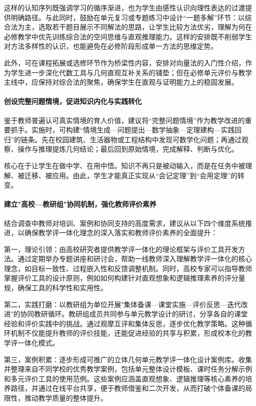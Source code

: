 \documentclass[UTF8,a4paper,12pt,twoside]{ctexart}
\begin{document}
这样的认知序列既强调学习的循序渐进，也为学生由感性认识向理性表达的过渡提供明确路径。与此同时，鼓励在单元复习或专题练习中设计“一题多解”环节：以综合法为主，选取若干题目展示不同解法的思路，让学生比较方法优劣，理解为何在必修教学中优先训练综合法的空间思维与直观推理能力。这样的安排既不削弱学生对方法多样性的认识，也能避免在必修阶段形成单一方法的思维定势。

此外，可在课程拓展或选修环节作为桥梁性内容，安排对向量法的入门性介绍，作为学生进一步深化代数工具与几何直观互补关系的铺垫；但在必修单元评价与教学主线中，应保持对综合法的聚焦，确保学生在直观与证明能力上的稳固发展。

\paragraph{创设完整问题情境，促进知识内化与实践转化}

鉴于教师普遍认可真实情境的育人价值，建议将“完整问题情境”作为教学改进的重要抓手。实施时，可构建“情境生成—问题提出—数学抽象—定理建构—实践回归”的链条。先在校园建筑、生活器物或工程结构中发现可数学化问题；再通过观察、操作与推理提炼几何结论；最后回到原始情境，完成解释、判断与优化。

核心在于让学生在做中学、在用中悟。知识不再只是被动输入，而是在任务中被理解、被迁移、被应用。由此，学生才能真正实现从“会记定理”到“会用定理”的转变。

\paragraph{建立"高校—教研组"协同机制，强化教师评价素养}

结合调查中教师对培训、案例和协同支持的高度需求，建议从以下四个维度系统推进，以确保教学评一体化理念的深入落实和教师评价素养的全面提升：

第一，理论引领：由高校研究者提供教学评一体化的理论框架与评价工具开发方法。通过定期举办专题讲座和研讨会，帮助一线教师深入理解教学评一体化的核心理念，如目标一致性、过程嵌入性和反馈调整机制。同时，高校专家可以指导教师掌握评价工具的设计原则，例如如何构建针对直观想象和逻辑推理素养的评分量规，确保工具的科学性和实用性。

第二，实践打磨：以教研组为单位开展"集体备课—课堂实施—评价反思—迭代改进"的协同教研循环。教研组成员共同参与单元教学设计的研讨，分享各自的课堂经验和评价实践中的挑战。通过观摩互评和集体反思，逐步优化教学策略。这种循环机制不仅能提升教师的评价技能，还能促进经验的共享与积累，形成校本化的教学评一体化模式。

第三，案例积累：逐步形成可推广的立体几何单元教学评一体化设计案例库。收集并整理来自不同学校的优秀教学案例，包括单元整体设计模板、课时任务分解示例和多元评价工具的使用范例。这些案例应涵盖直观想象、逻辑推理等核心素养的培养路径，并通过在线平台共享，便于教师借鉴和二次开发，从而打破个体备课的局限性，推动教学质量的整体提升。
\end{document}
